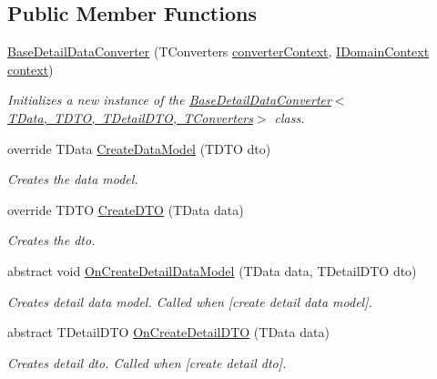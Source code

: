 \subsection*{Public Member Functions}
\begin{DoxyCompactItemize}
\item 
\mbox{\hyperlink{class_bar_none_1_1_shared_1_1_data_converter_1_1_core_1_1_base_detail_data_converter_ac8321389de60b0bbc79c12d167c2d95f}{Base\+Detail\+Data\+Converter}} (T\+Converters \mbox{\hyperlink{class_bar_none_1_1_shared_1_1_data_converter_1_1_core_1_1_base_data_converter_aa680c5a5e00d4330616f98e3cacffa42}{converter\+Context}}, \mbox{\hyperlink{interface_bar_none_1_1_shared_1_1_core_1_1_i_domain_context}{I\+Domain\+Context}} \mbox{\hyperlink{class_bar_none_1_1_shared_1_1_data_converter_1_1_core_1_1_base_data_converter_ae96bc28386162a9cff2a303c270a12b4}{context}})
\begin{DoxyCompactList}\small\item\em Initializes a new instance of the \mbox{\hyperlink{class_bar_none_1_1_shared_1_1_data_converter_1_1_core_1_1_base_detail_data_converter_ac8321389de60b0bbc79c12d167c2d95f}{Base\+Detail\+Data\+Converter$<$\+T\+Data, T\+D\+T\+O, T\+Detail\+D\+T\+O, T\+Converters$>$}} class. \end{DoxyCompactList}\item 
override T\+Data \mbox{\hyperlink{class_bar_none_1_1_shared_1_1_data_converter_1_1_core_1_1_base_detail_data_converter_ad6225cb3dbfdf5c776a24ca4a3339c5f}{Create\+Data\+Model}} (T\+D\+TO dto)
\begin{DoxyCompactList}\small\item\em Creates the data model. \end{DoxyCompactList}\item 
override T\+D\+TO \mbox{\hyperlink{class_bar_none_1_1_shared_1_1_data_converter_1_1_core_1_1_base_detail_data_converter_a70b8d006525ede0e8be34f3fcbf71bb9}{Create\+D\+TO}} (T\+Data data)
\begin{DoxyCompactList}\small\item\em Creates the dto. \end{DoxyCompactList}\item 
abstract void \mbox{\hyperlink{class_bar_none_1_1_shared_1_1_data_converter_1_1_core_1_1_base_detail_data_converter_a1164049c7b282195e4e9c9d2ecaaac58}{On\+Create\+Detail\+Data\+Model}} (T\+Data data, T\+Detail\+D\+TO dto)
\begin{DoxyCompactList}\small\item\em Creates detail data model. Called when \mbox{[}create detail data model\mbox{]}. \end{DoxyCompactList}\item 
abstract T\+Detail\+D\+TO \mbox{\hyperlink{class_bar_none_1_1_shared_1_1_data_converter_1_1_core_1_1_base_detail_data_converter_ae96fe016e35bfc9200cb344f4686ca0f}{On\+Create\+Detail\+D\+TO}} (T\+Data data)
\begin{DoxyCompactList}\small\item\em Creates detail dto. Called when \mbox{[}create detail dto\mbox{]}. \end{DoxyCompactList}\end{DoxyCompactItemize}
